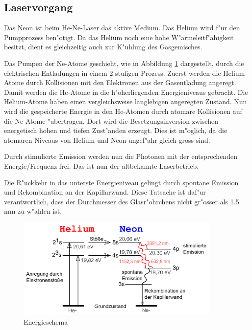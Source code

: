 \begin{refsection}
\subsection{Laservorgang}
Das Neon ist beim He-Ne-Laser das aktive Medium. Das Helium wird f"ur den 
Pumpprozess ben"otigt. 
Da das Helium noch eine hohe W"armeleitf"ahigkeit besitzt, dient es 
gleichzeitig auch zur K"uhlung des Gasgemisches.

Das Pumpen der Ne-Atome geschieht, wie in Abbildung \ref{Energieschema} 
dargestellt, durch die elektrischen Entladungen in einem 2 stufigen Prozess. 
Zuerst werden die Helium Atome durch Kollisionen mit den Elektronen aus der 
Gasentladung angeregt. Damit werden die He-Atome in die h"oherliegenden 
Energieniveaus gebracht.
Die Helium-Atome haben einen vergleichsweise langlebigen angeregten Zustand. 
Nun wird die gespeicherte Energie in den He-Atomen durch atomare Kollisionen 
auf die Ne-Atome "ubertragen. Dort wird die Besetzungsinversion zwischen 
energetisch hohen und tiefen Zust"anden erzeugt. Dies ist m"oglich, da die 
atomaren Niveaus von Helium und Neon ungef"ahr gleich gross sind.

Durch stimulierte Emission werden nun die Photonen mit der entsprechenden 
Energie/Frequenz frei. Das ist nun der altbekannte Laserbetrieb.

Die R"uckkehr in das unterste Energieniveau  gelingt durch spontane Emission 
und Rekombination an der Kapillarwand. Diese Tatsache ist daf"ur 
verantwortlich, dass der Durchmesser des Glasr"ohrchens nicht gr"osser als 1.5 
mm zu w"ahlen ist. 


\begin{figure}
\centering
\includegraphics[width = 10cm]{laser/bilder/Energieschema.png}
\caption{Energieschema \cite{He-Ne-Laser-Energieschema}}
\label{Energieschema}
\end{figure}

\printbibliography[heading=subbibliography]

\end{refsection}

